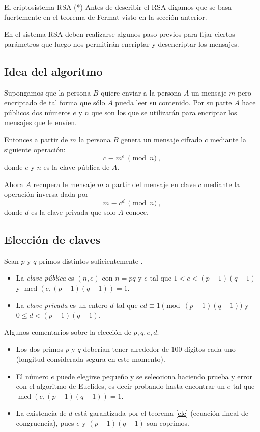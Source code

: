 \begin{section}{El criptosistema RSA (*)}
Antes de describir el RSA digamos que se basa fuertemente en el teorema de Fermat visto en la sección anterior. 


En el sistema RSA deben realizarse algunos paso previos para fijar ciertos parámetros que luego nos permitirán encriptar y desencriptar los mensajes.



\subsection*{Idea del  algoritmo}

Supongamos que la persona $B$  quiere enviar a la persona $A$ un mensaje $m$ pero encriptado de tal forma que sólo $A$ pueda leer su contenido. Por su parte $A$ hace públicos dos números $e$ y $n$ que son los que se utilizarán para encriptar los mensajes que le envíen. 

Entonces a partir de $m$ la persona $B$ genera un mensaje cifrado $c$ mediante la siguiente ope\-ra\-ción:
$$
    c\equiv m^e\ \pmod{n}\ ,
$$
donde $e$ y $n$ es la clave pública de $A$.

Ahora $A$ recupera le mensaje $m$ a partir del mensaje en clave $c$ mediante la operación inversa dada por
$$
    m\equiv c^d\ \pmod{n}\ ,
$$
donde $d$ es la clave privada que solo $A$ conoce.




\subsection*{Elección de claves}



Sean  $p$ y $q$ primos distintos suficientemente . 
\begin{itemize}
    \item  La \emph{clave pública} es $(n, e)$ con $n = pq$ y $e$ tal que $1 < e < (p-1)(q-1)$ y $\operatorname{mcd}(e, (p-1)(q-1)) = 1$. 
    \item  La \emph{clave privada} es un entero $d$ tal que $ed \equiv 1 \pmod{(p-1)(q-1)}$ y $0 \le d <(p-1)(q-1)$.
\end{itemize}


\begin{observacion*} Algunos comentarios sobre la elección de $p,q,e,d$.
\begin{itemize}
\item
Los dos primos $p$ y $q$ deberían tener alrededor de $100$ dígitos cada uno (longitud considerada segura en este momento).
\item
El número $e$ puede elegirse pequeño y se selecciona haciendo prueba y error con el algoritmo de Euclides, es decir probando hasta encontrar un $e$ tal que $\operatorname{mcd}(e, (p-1)(q-1)) = 1$.
\item
La existencia de $d$ está garantizada por el teorema \ref{elc} (ecuación lineal de congruencia), pues $e$ y $(p-1)(q-1)$ son coprimos.
\end{itemize}


\end{observacion*}
\end{section}
